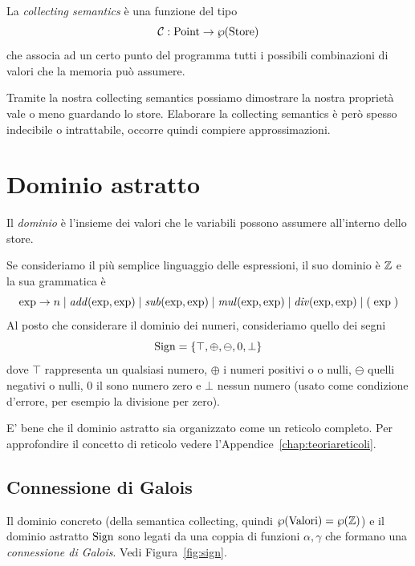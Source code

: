 \begin{definition}
La \emph{collecting semantics} è una funzione del tipo
\[ \mathcal{C} : \mathrm{Point} \to \mathrm{\wp}(\mathrm{Store}) \]
che associa ad un certo punto del programma tutti i possibili combinazioni di valori che la memoria può assumere.
\end{definition}

Tramite la nostra collecting semantics possiamo dimostrare la nostra proprietà vale o meno guardando lo store. Elaborare la collecting semantics è però spesso indecibile o intrattabile, occorre quindi compiere approssimazioni.

\section{Dominio astratto}

\begin{definition}[Dominio]
Il \emph{dominio} è l'insieme dei valori che le variabili possono assumere all'interno dello store. 
\end{definition}

\begin{example}\label{example:sign}
Se consideriamo il più semplice linguaggio delle espressioni, il suo dominio è $\mathbb{Z}$ e la sua grammatica è 
\[ \mathrm{exp} \to n 
    \mid \mathit{add}(\mathrm{exp}, \mathrm{exp})
    \mid \mathit{sub}(\mathrm{exp}, \mathrm{exp})
    \mid \mathit{mul}(\mathrm{exp}, \mathrm{exp})
    \mid \mathit{div}(\mathrm{exp}, \mathrm{exp}) 
    \mid ( \; \mathrm{exp} \; ) \]
Al posto che considerare il dominio dei numeri, consideriamo quello dei segni
\[ \mathrm{Sign} = \{ \top, \oplus, \ominus, 0, \bot \} \]
dove $\top$ rappresenta un qualsiasi numero, $\oplus$ i numeri positivi o o nulli, $\ominus$ quelli negativi o nulli, $0$ il sono numero zero e $\bot$ nessun numero (usato come condizione d'errore, per esempio la divisione per zero). 
\end{example}

E' bene che il dominio astratto sia organizzato come un reticolo completo. Per approfondire il concetto di reticolo vedere l'Appendice~\ref{chap:teoriareticoli}.

\subsection{Connessione di Galois}\label{sec:galois-c}

Il dominio concreto (della semantica collecting, quindi $\wp(\mathrm{Valori}) = \wp(\mathbb{Z})$) e il dominio astratto $\mathrm{Sign}$ sono legati da una coppia di funzioni $\alpha,\gamma$ che formano una \emph{connessione di Galois}. Vedi Figura~\ref{fig:sign}.

